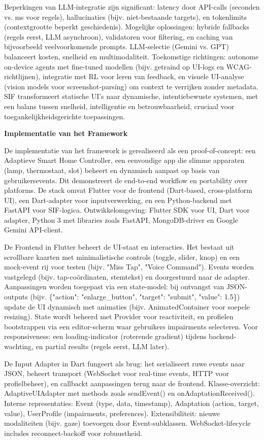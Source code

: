 \documentclass[openany]{book}
\begin{document}
Beperkingen van LLM-integratie zijn significant: latency door API-calls (seconden vs. ms voor regels), hallucinaties (bijv. niet-bestaande targets), en tokenlimits (contextgrootte beperkt geschiedenis). Mogelijke oplossingen: hybride fallbacks (regels eerst, LLM asynchroon), validatoren voor filtering, en caching van bijvoorbeeld veelvoorkomende prompts. LLM-selectie (Gemini vs. GPT) balanceert kosten, snelheid en multimodaliteit. Toekomstige richtingen: autonome on-device agents met fine-tuned modellen (bijv. getraind op UI-logs en WCAG-richtlijnen), integratie met RL voor leren van feedback, en visuele UI-analyse (vision models voor screenshot-parsing) om context te verrijken zonder metadata.
SIF transformeert statische UI's naar dynamische, intentiebewuste systemen, met een balans tussen snelheid, intelligentie en betrouwbaarheid, cruciaal voor toegankelijkheidsgerichte toepassingen.

\textbf{Implementatie van het Framework}

De implementatie van het framework is gerealiseerd als een proof-of-concept: een Adaptieve Smart Home Controller, een eenvoudige app die slimme apparaten (lamp, thermostaat, slot) beheert en dynamisch aanpast op basis van gebruikersevents. Dit demonstreert de end-to-end workflow en portability over platforms. De stack omvat Flutter voor de frontend (Dart-based, cross-platform UI), een Dart-adapter voor inputverwerking, en een Python-backend met FastAPI voor SIF-logica. Ontwikkelomgeving: Flutter SDK voor UI, Dart voor adapter, Python 3 met libraries zoals FastAPI, MongoDB-driver en Google Gemini API-client.

De Frontend in Flutter beheert de UI-staat en interacties. Het bestaat uit scrollbare kaarten met minimalistische controls (toggle, slider, knop) en een mock-event rij voor testen (bijv. "Miss Tap", "Voice Command"). Events worden vastgelegd (bijv. tap-coördinaten, stemtekst) en doorgestuurd naar de adapter. Aanpassingen worden toegepast via een state-model: bij ontvangst van JSON-outputs (bijv. \{"action": "enlarge\_button", "target": "submit", "value": 1.5\}) update de UI dynamisch met animaties (bijv. AnimatedContainer voor soepele resizing). State wordt beheerd met Provider voor reactiviteit, en profielen bootstrappen via een editor-scherm waar gebruikers impairments selecteren. Voor responsiveness: een loading-indicator (roterende gradient) tijdens backend-wachting, en partial results (regels eerst, LLM later).

De Input Adapter in Dart fungeert als brug: het serialiseert ruwe events naar JSON, beheert transport (WebSocket voor real-time events, HTTP voor profielbeheer), en callbackt aanpassingen terug naar de frontend. Klasse-overzicht: AdaptiveUIAdapter met methods zoals sendEvent() en onAdaptationReceived(). Interne representaties: Event (type, data, timestamp), Adaptation (action, target, value), UserProfile (impairments, preferences). Extensibiliteit: nieuwe modaliteiten (bijv. gaze) toevoegen door Event-subklassen. WebSocket-lifecycle includes reconnect-backoff voor robuustheid.
\end{document}
